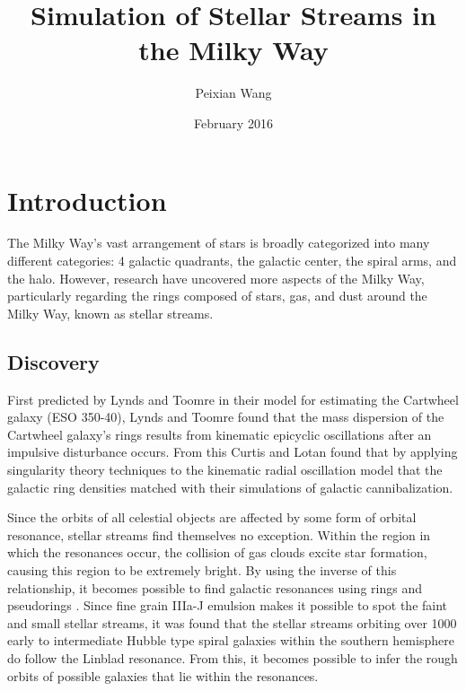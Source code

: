 \documentclass{article}
\title{Simulation of Stellar Streams in the Milky Way}
\author{Peixian Wang}
\date{February 2016}
\begin{document}
\maketitle

\section{Introduction}

\indent The Milky Way's vast arrangement of stars is broadly categorized into many different categories: 4 galactic quadrants, the galactic center, the spiral arms, and the halo. However, research have uncovered more aspects of the Milky Way, particularly regarding the rings composed of stars, gas, and dust around the Milky Way, known as stellar streams. 

\subsection{Discovery} \indent First predicted by Lynds and Toomre \cite{lyndsAndToomre} in their model for estimating the Cartwheel galaxy (ESO 350-40), Lynds and Toomre found that the mass dispersion of the Cartwheel galaxy's rings results from kinematic epicyclic oscillations after an impulsive disturbance occurs. From this Curtis and Lotan \cite{symmetricStellarRings} found that by applying singularity theory techniques to the kinematic radial oscillation model that the galactic ring densities matched with their simulations of galactic cannibalization. 

\indent Since the orbits of all celestial objects are affected by some form of orbital resonance, stellar streams find themselves no exception. Within the region in which the resonances occur, the collision of gas clouds excite star formation, causing this region to be extremely bright. By using the inverse of this relationship, it becomes possible to find galactic resonances using rings and pseudorings \cite{ringsAndPseudoRings}. Since fine grain IIIa-J emulsion makes it possible to spot the faint and small stellar streams, it was found that the stellar streams orbiting over 1000 early to intermediate Hubble type spiral galaxies within the southern hemisphere do follow the Linblad resonance. From this, it becomes possible to infer the rough orbits of possible galaxies that lie within the resonances. 
\end{document}
